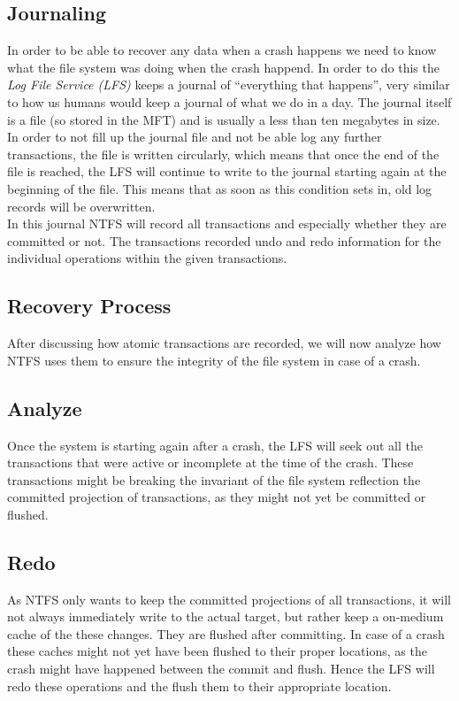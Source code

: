 \subsection{Journaling}
In order to be able to recover any data when a crash happens we need to know what the file system was doing when the crash happend. In order to do this the \textit{Log File Service (LFS)} keeps a journal of ``everything that happens'', very similar to how us humans would keep a journal of what we do in a day. The journal itself is a file (so stored in the MFT) and is usually a less than ten megabytes in size. In order to not fill up the journal file and not be able log any further transactions, the file is written circularly, which means that once the end of the file is reached, the LFS will continue to write to the journal starting again at the beginning of the file. This means that as soon as this condition sets in, old log records will be overwritten. \cite{RUSSINOVICH_ET_AL:2012:WI}\\
In this journal NTFS will record all transactions and especially whether they are committed or not. The transactions recorded undo and redo information for the individual operations within the given transactions.
\subsection{Recovery Process}
After discussing how atomic transactions are recorded, we will now analyze how NTFS uses them to ensure the integrity of the file system in case of a crash.
\subsection*{Analyze}
Once the system is starting again after a crash, the LFS will seek out all the transactions that were active or incomplete at the time of the crash. These transactions might be breaking the invariant of the file system reflection the committed projection of transactions, as they might not yet be committed or flushed.
\subsection*{Redo}
As NTFS only wants to keep the committed projections of all transactions, it will not always immediately write to the actual target, but rather keep a on-medium cache of the these changes. They are flushed after committing. In case of a crash these caches might not yet have been flushed to their proper locations, as the crash might have happened between the commit and flush. Hence the LFS will redo these operations and the flush them to their appropriate location.
